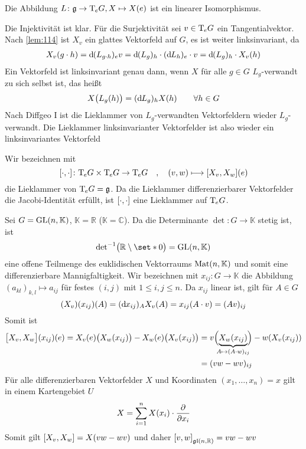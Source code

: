 \begin{korollar}
	Die Abbildung $L \colon \mathfrak{g} \to \Tmap_e G, X \mapsto X(e)$ ist ein linearer Isomorphismus.
\end{korollar}
\begin{beweis}
	Die Injektivität ist klar.
	Für die Surjektivität sei $v \in \Tmap_e G$ ein Tangentialvektor.
	Nach \autoref{lem:114} ist $X_v$ ein glattes Vektorfeld auf $G$, es ist weiter linksinvariant, da
	\begin{align}
		X_v(g \cdot h) = \mathd(L_{g \cdot h})_e v = \mathd(L_g)_h \cdot (\mathd L_h)_e \cdot v = \mathd (L_g)_h \cdot X_v(h)
	\end{align}
	Ein Vektorfeld ist linksinvariant genau dann, wenn $X$ für alle $g \in G$ $L_g$-verwandt zu sich selbst ist, das heißt
	\[
		X \enbrace[\big]{L_g(h)} = (\mathd L_g)_h X(h) \qquad  \forall h \in G
	\]
	Nach Diffgeo I ist die Lieklammer von $L_g$-verwandten Vektorfeldern wieder $L_g$-verwandt.
	Die Lieklammer linksinvarianter Vektorfelder ist also wieder ein linksinvariantes Vektorfeld
\end{beweis}

\begin{definition}
	Wir bezeichnen mit 
	\[
		\benbrace*{\cdot ,\cdot } \colon \Tmap_e G \times \Tmap_e G \to \Tmap_e G \quad ,\quad  (v,w) \longmapsto \benbrace*{X_v,X_w}(e)
	\] 
	die Lieklammer von $\Tmap_e G = \mathfrak{g}$.
	Da die Lieklammer differenzierbarer Vektorfelder die Jacobi-Identität erfüllt, ist $\benbrace*{\cdot ,\cdot }$ eine Lieklammer auf $\Tmap_e G$.
\end{definition}

Sei $G=\GL(n,\mathbb{K})$, $\mathbb{K}=\mathbb{R}$ ($\mathbb{K}=\mathbb{C}$).
Da die Determinante $\det \colon G \to \mathbb{K}$ stetig ist, ist 
\[
	{\det}^{-1} \enbrace[\big]{\mathbb{R}\setminus \set*{0}} = \GL(n,\mathbb{K}) 
\]
eine offene Teilmenge des euklidischen Vektorraums $\Mat(n,\mathbb{K})$ und somit eine differenzierbare Mannigfaltigkeit.
Wir bezeichnen mit $x_{ij} \colon G \to \mathbb{K}$ die Abbildung $(a_{kl})_{k,l} \mapsto a_{ij}$ für festes $(i,j)$ mit $1\le i,j\le n$.
Da $x_{ij}$ linear ist, gilt für $A \in G$
\[
	(X_v)(x_{ij})(A) = (\mathd x_{ij})_A X_v(A) = x_{ij}(A \cdot v) = (A v)_{ij}
\]
Somit ist
\begin{align}
	\benbrace[\big]{X_v,X_w}(x_{ij})(e) = X_v(e) \enbrace[\big]{X_w(x_{ij})} - X_w(e) \enbrace[\big]{X_v(x_{ij})} &= v \enbrace[\Big]{\Underbrace{X_w(x_{ij})}{\mathclap{A \mapsto (A \cdot w)_{ij}}}} - w \enbrace*{X_v(x_{ij})} \\
	&= (v w- w v)_{ij}
\end{align}
Für alle differenzierbaren Vektorfelder $X$ und Koordinaten $(x_1, \ldots ,x_n)=x$  gilt in einem Kartengebiet $U$
\[
	X = \sum_{i=1}^{n} X(x_i) \cdot \diff{}{x_i}
\]
Somit gilt $\benbrace*{X_v,X_w} =X(vw -wv)$ und daher $\benbrace*{v,w}_{\mathfrak{gl}(n,\mathbb{R})}=vw -wv$

